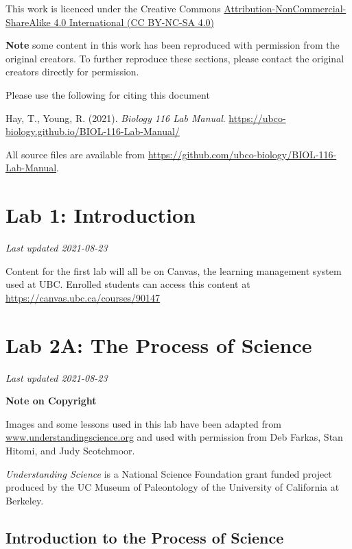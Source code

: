 \documentclass[
]{book}
\begin{document}
This work is licenced under the Creative Commons \href{https://creativecommons.org/licenses/by-nc-sa/4.0/}{Attribution-NonCommercial-ShareAlike 4.0 International (CC BY-NC-SA 4.0)}

\textbf{Note} some content in this work has been reproduced with permission from the original creators. To further reproduce these sections, please contact the original creators directly for permission.

Please use the following for citing this document

Hay, T., Young, R. (2021). \emph{Biology 116 Lab Manual}. \url{https://ubco-biology.github.io/BIOL-116-Lab-Manual/}

All source files are available from \url{https://github.com/ubco-biology/BIOL-116-Lab-Manual}.

\hypertarget{lab-1-introduction}{%
\chapter*{Lab 1: Introduction}\label{lab-1-introduction}}

\emph{Last updated 2021-08-23}

Content for the first lab will all be on Canvas, the learning management system used at UBC. Enrolled students can access this content at \url{https://canvas.ubc.ca/courses/90147}

\hypertarget{lab-2a-the-process-of-science}{%
\chapter*{Lab 2A: The Process of Science}\label{lab-2a-the-process-of-science}}

\emph{Last updated 2021-08-23}

\textbf{Note on Copyright}

Images and some lessons used in this lab have been adapted from \href{http://www.understandingscience.org/}{www.understandingscience.org} and used with permission from Deb Farkas, Stan Hitomi, and Judy Scotchmoor.

\emph{Understanding Science} is a National Science Foundation grant funded project produced by the UC Museum of Paleontology of the University of California at Berkeley.

\hypertarget{introduction-to-the-process-of-science}{%
\section*{Introduction to the Process of Science}\label{introduction-to-the-process-of-science}}
\end{document}
